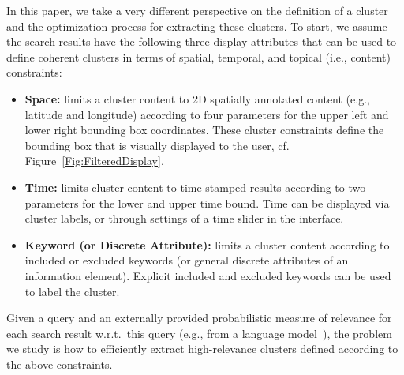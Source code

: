 In this paper, we take a very different perspective on the definition of a cluster and the optimization process for extracting these clusters.  To start, we assume the search results have the following three display attributes that can be used to define coherent clusters in terms of spatial, temporal, and topical (i.e., content) constraints:
\begin{itemize}
\item {\bf Space:} limits a cluster content to 2D spatially annotated content (e.g., latitude and longitude) according to four parameters for the upper left and lower right bounding box coordinates.  These cluster constraints define the bounding box that is visually displayed to the user, cf. Figure~\ref{Fig:FilteredDisplay}.
\item {\bf Time:} limits cluster content to time-stamped results according to two parameters for the lower and upper time bound.  Time can be displayed via cluster labels, or through settings of a time slider in the interface.
\item {\bf Keyword (or Discrete Attribute):} limits a  cluster content according to included or excluded keywords (or general discrete attributes of an information element).
Explicit included and excluded keywords can be used to label the cluster. 
\end{itemize}
Given a query and an externally provided probabilistic measure of relevance for each search result w.r.t.\ this query (e.g., from a language model~\cite{Zhai2001}), 
the problem we study is how to efficiently extract high-relevance clusters defined according to the above constraints.

